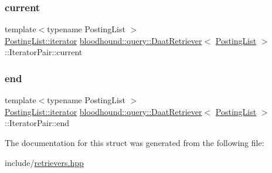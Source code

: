 \subsubsection{\texorpdfstring{current}{current}}
{\footnotesize\ttfamily template$<$typename Posting\+List $>$ \\
\hyperlink{structbloodhound_1_1PostingList_1_1iterator}{Posting\+List\+::iterator} \hyperlink{classbloodhound_1_1query_1_1DaatRetriever}{bloodhound\+::query\+::\+Daat\+Retriever}$<$ \hyperlink{classbloodhound_1_1PostingList}{Posting\+List} $>$\+::Iterator\+Pair\+::current}

\mbox{\label{structbloodhound_1_1query_1_1DaatRetriever_1_1IteratorPair_af2205effb4b97e6351c3d32c034342c2}} 
\subsubsection{\texorpdfstring{end}{end}}
{\footnotesize\ttfamily template$<$typename Posting\+List $>$ \\
\hyperlink{structbloodhound_1_1PostingList_1_1iterator}{Posting\+List\+::iterator} \hyperlink{classbloodhound_1_1query_1_1DaatRetriever}{bloodhound\+::query\+::\+Daat\+Retriever}$<$ \hyperlink{classbloodhound_1_1PostingList}{Posting\+List} $>$\+::Iterator\+Pair\+::end}



The documentation for this struct was generated from the following file\+:\begin{DoxyCompactItemize}
\item 
include/\hyperlink{retrievers_8hpp}{retrievers.\+hpp}\end{DoxyCompactItemize}
